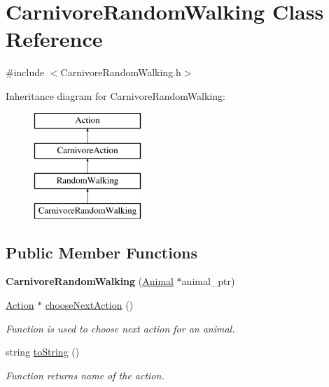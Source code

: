 \hypertarget{class_carnivore_random_walking}{}\section{Carnivore\+Random\+Walking Class Reference}
\label{class_carnivore_random_walking}


{\ttfamily \#include $<$Carnivore\+Random\+Walking.\+h$>$}

Inheritance diagram for Carnivore\+Random\+Walking\+:\begin{figure}[H]
\begin{center}
\leavevmode
\includegraphics[height=4.000000cm]{class_carnivore_random_walking}
\end{center}
\end{figure}
\subsection*{Public Member Functions}
\begin{DoxyCompactItemize}
\item 
\hypertarget{class_carnivore_random_walking_a93f885512562068700bdf324058e142e}{}{\bfseries Carnivore\+Random\+Walking} (\hyperlink{class_animal}{Animal} $\ast$animal\+\_\+ptr)\label{class_carnivore_random_walking_a93f885512562068700bdf324058e142e}

\item 
\hyperlink{class_action}{Action} $\ast$ \hyperlink{class_carnivore_random_walking_ac340cd2cebe482ce2e8a616b347dc9da}{choose\+Next\+Action} ()
\begin{DoxyCompactList}\small\item\em Function is used to choose next action for an animal. \end{DoxyCompactList}\item 
string \hyperlink{class_carnivore_random_walking_ae34e8070f9ac8826bb08141c43adcaf5}{to\+String} ()
\begin{DoxyCompactList}\small\item\em Function returns name of the action. \end{DoxyCompactList}\end{DoxyCompactItemize}
